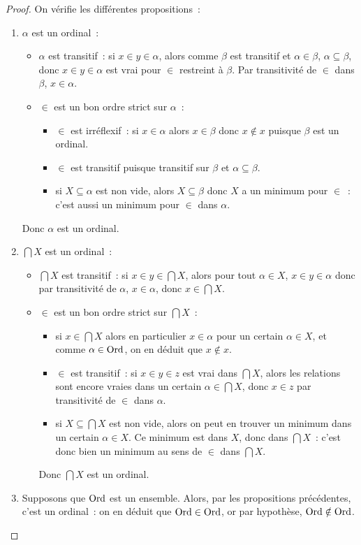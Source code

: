 \begin{proof}
  On vérifie les différentes propositions~:
  \begin{enumerate}
  \item $\alpha$ est un ordinal~:
    \begin{itemize}
    \item $\alpha$ est transitif~: si $x\in y \in \alpha$, alors comme
      $\beta$ est transitif et $\alpha \in \beta$, $\alpha\subseteq \beta$,
      donc $x \in y \in \alpha$ est vrai pour $\in$ restreint à $\beta$. Par
      transitivité de $\in$ dans $\beta$, $x\in\alpha$.
    \item $\in$ est un bon ordre strict sur $\alpha$~:
      \begin{itemize}
      \item $\in$ est irréflexif~: si $x\in \alpha$ alors $x\in \beta$ donc
        $x\notin x$ puisque $\beta$ est un ordinal.
      \item $\in$ est transitif puisque transitif sur $\beta$ et
        $\alpha\subseteq\beta$.
      \item si $X\subseteq \alpha$ est non vide, alors $X\subseteq \beta$
        donc $X$ a un minimum pour $\in$~: c'est aussi un minimum pour $\in$
        dans $\alpha$.
      \end{itemize}
    \end{itemize}
    Donc $\alpha$ est un ordinal.
  \item $\bigcap X$ est un ordinal~:
    \begin{itemize}
    \item $\bigcap X$ est transitif~: si $x\in y \in \bigcap X$, alors pour
      tout $\alpha \in X$, $x \in y \in \alpha$ donc par transitivité de
      $\alpha$, $x \in \alpha$, donc $x\in \bigcap X$.
    \item $\in$ est un bon ordre strict sur $\bigcap X$~:
      \begin{itemize}
      \item si $x \in \bigcap X$ alors en particulier $x\in \alpha$ pour un
        certain $\alpha \in X$, et comme $\alpha \in \operatorname{Ord}$, on en déduit que
        $x\notin x$.
      \item $\in$ est transitif~: si $x\in y \in z$ est vrai dans $\bigcap X$,
        alors les relations sont encore vraies dans un certain
        $\alpha \in \bigcap X$, donc $x \in z$ par transitivité de $\in$ dans
        $\alpha$.
      \item si $X\subseteq \bigcap X$ est non vide, alors on peut en trouver
        un minimum dans un certain $\alpha \in X$. Ce minimum est dans
        $X$, donc dans $\bigcap X$~: c'est donc bien un minimum au sens de $\in$
        dans $\bigcap X$.
      \end{itemize}
      Donc $\bigcap X$ est un ordinal.
    \end{itemize}
  \item Supposons que $\operatorname{Ord}$ est un ensemble. Alors, par les propositions
    précédentes, c'est un ordinal~: on en déduit que $\operatorname{Ord}\in\operatorname{Ord}$, or par
    hypothèse, $\operatorname{Ord}\notin\operatorname{Ord}$.
  \end{enumerate}
\end{proof}

